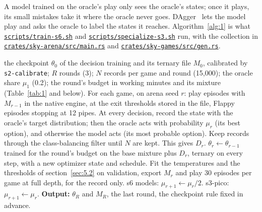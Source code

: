 \documentclass[10pt]{article}
\begin{document}
A model trained on the oracle's play only sees the oracle's states; once it plays, its small mistakes take it where the oracle never goes. DAgger~\cite{ross2011dagger} lets the model play and asks the oracle to label the states it reaches. Algorithm~\ref{alg:1} is what \href{https://github.com/maxgfr/skycmd/blob/main/scripts/train-s6.sh}{\texttt{scripts/\allowbreak{}train-s6.sh}} and \href{https://github.com/maxgfr/skycmd/blob/main/scripts/specialize-s3.sh}{\texttt{scripts/\allowbreak{}specialize-s3.sh}} run, with the collection in \href{https://github.com/maxgfr/skycmd/blob/main/crates/sky-arena/src/main.rs}{\texttt{crates/\allowbreak{}sky-arena/\allowbreak{}src/\allowbreak{}main.rs}} and \href{https://github.com/maxgfr/skycmd/blob/main/crates/sky-games/src/gen.rs}{\texttt{crates/\allowbreak{}sky-games/\allowbreak{}src/\allowbreak{}gen.rs}}.

\begin{algorithm}[htbp]
\caption{DAgger rounds as implemented.}\label{alg:1}
\begin{algorithmic}[1]
\Require the checkpoint $\theta_0$ of the decision training and its ternary file $M_0$, calibrated by \texttt{s2-calibrate}; $R$ rounds (3); $N$ records per game and round (15,000); the oracle share $\mu_1$ (0.2); the round's budget in working minutes and its mixture (Table~\ref{tab:1} and below).
\State For each game, on arena seed $r$: play episodes with $M_{r-1}$ in the native engine, at the exit thresholds stored in the file, Flappy episodes stopping at 12 pipes. At every decision, record the state with the oracle's target distribution; then the oracle acts with probability $\mu_r$ (its best option), and otherwise the model acts (its most probable option). Keep records through the class-balancing filter until $N$ are kept. This gives $D_r$.
\State $\theta_r \gets \theta_{r-1}$ trained for the round's budget on the base mixture plus $D_r$, ternary on every step, with a new optimizer state and schedule.
\State Fit the temperatures and the thresholds of section~\ref{sec:5.2} on validation, export $M_r$ and play 30 episodes per game at full depth, for the record only.
\State s6 models: $\mu_{r+1} \gets \mu_r / 2$. s3-pico: $\mu_{r+1} \gets \mu_r$.
\EndFor
\State \textbf{Output:} $\theta_R$ and $M_R$, the last round, the checkpoint rule fixed in advance.
\end{algorithmic}
\end{algorithm}
\end{document}
